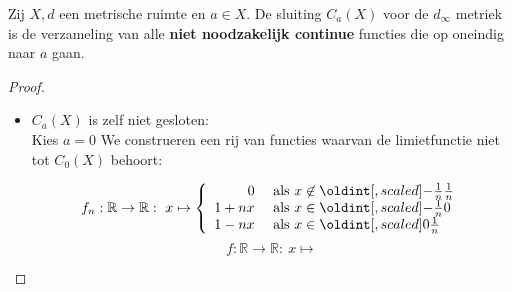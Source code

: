\documentclass[main.tex]{subfiles}
\begin{document}
\begin{st}
  Zij $X,d$ een metrische ruimte en $a\in X$.
  De sluiting $C_{a}(X)$ voor de $d_{\infty}$ metriek is de verzameling van alle \textbf{niet noodzakelijk continue} functies die op oneindig naar $a$ gaan.

  \begin{proof}
    \noindent
    \begin{itemize}
    \item $C_{a}(X)$ is zelf niet gesloten:\\
      Kies $a=0$
      We construeren een rij van functies waarvan de limietfunctie niet tot $C_{0}(X)$ behoort:

      \noindent
      \begin{minipage}{.45\textwidth}
        \begin{figure}[H]
          \centering
        \end{figure}
      \end{minipage}
      \begin{minipage}{.45\textwidth}
        \[
        f_{n}: \mathbb{R} \rightarrow \mathbb{R}:\ x \mapsto
        \left\{
          \begin{array}{rl}
            0 &\text{ als } x \not \in \interval{-\frac{1}{n}}{\frac{1}{n}}\\
            1+nx &\text{ als } x \in \interval{-\frac{1}{n}}{0}\\
            1-nx &\text{ als } x \in \interval{0}{\frac{1}{n}}\\
          \end{array}
        \right.
        \]
        \[
        f: \mathbb{R} \rightarrow \mathbb{R}:\ x \mapsto
\]
\end{minipage}
\end{itemize}
\end{proof}
\end{st}
\end{document}
